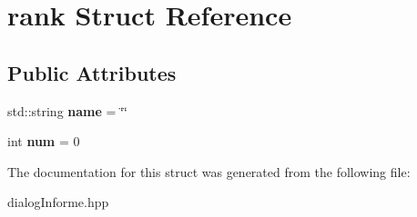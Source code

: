 \hypertarget{structrank}{}\section{rank Struct Reference}
\label{structrank}
\subsection*{Public Attributes}
\begin{DoxyCompactItemize}
\item 
\hypertarget{structrank_a635a988541e4791f0dd0f1181e4167ef}{}std\+::string {\bfseries name} = \char`\"{}\char`\"{}\label{structrank_a635a988541e4791f0dd0f1181e4167ef}

\item 
\hypertarget{structrank_a7248e7f4407c64d0662560318f3b89c9}{}int {\bfseries num} = 0\label{structrank_a7248e7f4407c64d0662560318f3b89c9}

\end{DoxyCompactItemize}


The documentation for this struct was generated from the following file\+:\begin{DoxyCompactItemize}
\item 
dialog\+Informe.\+hpp\end{DoxyCompactItemize}
